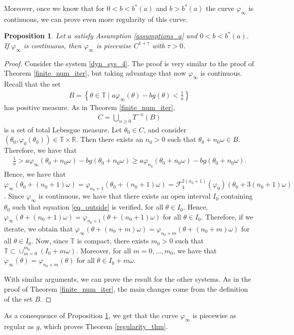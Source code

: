 \documentclass[12pt]{article}
\newcommand{\T}{\mathbb{T}}
\newcommand{\R}{\mathbb{R}}
\theoremstyle{plain}
\newtheorem{prop}[defn]{Proposition}
\theoremstyle{remark}
\theoremstyle{definition}
\begin{document}
Moreover, once we know that for $0<b<b^*(a)$ and $b>b^*(a)$ the curve $\varphi_\infty$ is continuous, we can prove even more regularity of this curve.
\begin{prop}\label{regularity_prop}
    Let $a$ satisfy Assumption \eqref{assumptions_a} and $0<b<b^*(a)$. If $\varphi_\infty$ is continuous, then $\varphi_\infty$ is piecewise $C^{1+\tau}$ with $\tau>0$.
\end{prop}
\begin{proof}
    Consider the system \eqref{dyn_sys_4}. The proof is very similar to the proof of Theorem \ref{finite_num_iter}, but taking advantage that now $\varphi_\infty$ is continuous. Recall that the set
    \begin{align*}
        B=\left\{\theta\in\T\mid a\varphi_\infty(\theta)-b g(\theta)<\frac{1}{a}\right\}
    \end{align*}
    has positive measure. As in Theorem \ref{finite_num_iter},
    \begin{align*}
        C=\bigcup_{n\geq0}T^{-n}(B)
    \end{align*}
    is a set of total Lebesgue measure. Let $\theta_0\in C$, and consider $(\theta_0,\varphi_0(\theta_0))\in\T\times\R$. Then there exists an $n_0>0$ such that $\theta_0+n_0\omega\in B$. Therefore, we have that 
    \begin{align}\label{eq_outside}
        \frac{1}{a}>a\varphi_\infty(\theta_0+n_0\omega)-b g(\theta_0+n_0\omega)\geq a\varphi_{n_0}(\theta_0+n_0\omega)-b g(\theta_0+n_0\omega).
    \end{align}
    Hence, we have that $\varphi_\infty(\theta_0+(n_0+1)\omega) = \varphi_{n_0+1}(\theta_0+(n_0+1)\omega) = \mathcal{F}_4^{2(n_0+1)}(\varphi_0)(\theta_0+3(n_0+1)\omega)$.
    Since $\varphi_\infty$ is continuous, we have that there exists an open interval $I_0$ containing $\theta_0$ such that equation \eqref{eq_outside} is verified, for all $\theta\in I_0$. Hence, $\varphi_\infty(\theta+(n_0+1)\omega) = \varphi_{n_0+1}(\theta+(n_0+1)\omega)$ for all $\theta\in I_0$. Therefore, if we iterate, we obtain that $\varphi_\infty(\theta+(n_0+m)\omega) = \varphi_{n_0+m}(\theta+(n_0+m)\omega)$ for all $\theta\in I_0$.
    Now, since $\T$ is compact, there exists $m_0>0$ such that $\T\subset\cup_{m=0}^{m_0} (I_0+m\omega)$. Moreover, for all $m=0,\dots,m_0$, we have that $\varphi_\infty(\theta) = \varphi_{n_0+m}(\theta)$ for all $\theta\in I_0+m\omega$.
    
    With similar arguments, we can prove the result for the other systems. As in the proof of Theorem \ref{finite_num_iter}, the main changes come from the definition of the set $B$.
\end{proof}
As a consequence of Proposition \ref{regularity_prop}, we get that the curve $\varphi_\infty$ is piecewise as regular as $g$, which proves Theorem \ref{regularity_thm}.
\end{document}
